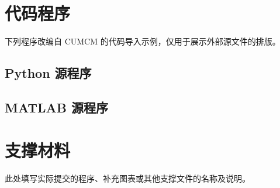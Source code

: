 \clearpage
\begin{appendices}
  \section{代码程序}
  \renewcommand{\thesubsection}{\Alph{section}\thinskip.\thinskip\arabic{subsection}}
  下列程序改编自 CUMCM 的代码导入示例，仅用于展示外部源文件的排版。

  \subsection{Python 源程序}
  

  \subsection{MATLAB 源程序}
  

  \section{支撑材料}
  此处填写实际提交的程序、补充图表或其他支撑文件的名称及说明。
\end{appendices}
